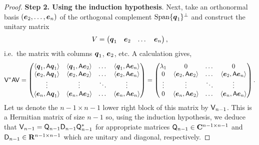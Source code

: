 \begin{proof}
        \vspace{.3cm}
        \textbf{Step 2. Using the induction hypothesis}.
        Next,
        take an orthonormal basis $(\mathbf{\boldsymbol{e}}_2, \dotsc, \mathbf{\boldsymbol{e}}_n)$ of the orthogonal complement $\operatorname{Span}\{\mathbf{\boldsymbol{q}}_1\}^\perp$
        and construct the unitary matrix
        \[
            V = \begin{pmatrix} \mathbf{\boldsymbol{q}}_1 & \mathbf{\boldsymbol{e}}_2 & \dots & \mathbf{\boldsymbol{e}}_n \end{pmatrix},
        \]
        i.e.\ the matrix with columns $\mathbf{\boldsymbol{q}}_1$, $\mathbf{\boldsymbol{e}}_2$, etc.
        A calculation gives,
        \[
            \mathsf V^* \mathsf A \mathsf V =
            \begin{pmatrix}
                \langle\mathbf{\boldsymbol{q}}_1, \mathsf A \mathbf{\boldsymbol{q}}_1\rangle & \langle\mathbf{\boldsymbol{q}}_1, \mathsf A \mathbf{\boldsymbol{e}}_2\rangle & \dots & \langle\mathbf{\boldsymbol{q}}_1, \mathsf A \mathbf{\boldsymbol{e}}_n\rangle \\
                \langle\mathbf{\boldsymbol{e}}_2, \mathsf A \mathbf{\boldsymbol{q}}_1\rangle & \langle\mathbf{\boldsymbol{e}}_2, \mathsf A \mathbf{\boldsymbol{e}}_2\rangle & \dots & \langle\mathbf{\boldsymbol{e}}_2, \mathsf A \mathbf{\boldsymbol{e}}_n\rangle \\
                \vdots & \vdots & \ddots & \vdots \\
                \langle\mathbf{\boldsymbol{e}}_n, \mathsf A \mathbf{\boldsymbol{q}}_1\rangle & \langle\mathbf{\boldsymbol{e}}_n, \mathsf A \mathbf{\boldsymbol{e}}_2\rangle & \dots & \langle\mathbf{\boldsymbol{e}}_n, \mathsf A \mathbf{\boldsymbol{e}}_n\rangle
            \end{pmatrix}
            =
            \begin{pmatrix}
                \lambda_1 & 0 & \dots & 0 \\
                0 & \langle\mathbf{\boldsymbol{e}}_2, \mathsf A \mathbf{\boldsymbol{e}}_2\rangle & \dots & \langle\mathbf{\boldsymbol{e}}_2, \mathsf A \mathbf{\boldsymbol{e}}_n\rangle \\
                \vdots & \vdots & \ddots & \vdots \\
                0 & \langle\mathbf{\boldsymbol{e}}_n, \mathsf A \mathbf{\boldsymbol{e}}_2\rangle & \dots & \langle\mathbf{\boldsymbol{e}}_n, \mathsf A \mathbf{\boldsymbol{e}}_n\rangle
            \end{pmatrix}.
        \]
        Let us denote the $n-1 \times n-1$ lower right block of this matrix by $\mathsf V_{n-1}$.
        This is a Hermitian matrix of size $n-1$ so,
        using the induction hypothesis,
        we deduce that $\mathsf V_{n-1} = \mathsf Q_{n-1} \mathsf D_{n-1} \mathsf Q_{n-1}^*$
        for appropriate matrices $\mathsf Q_{n-1} \in \mathbf C^{n-1 \times n-1}$ and $\mathsf D_{n-1} \in \mathbf R^{n-1 \times n-1}$
        which are unitary and diagonal, respectively.


\end{proof}

